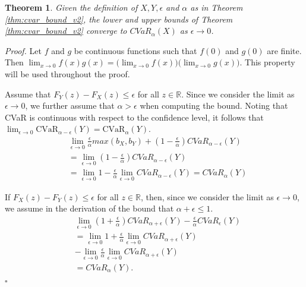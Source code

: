 \documentclass[letterpaper]{article} %
\newtheorem{theorem}{Theorem}[section]
\newenvironment{proof}{\noindent\textit{Proof.}}{\hfill$\square$}
\begin{document}
\begin{theorem}\label{thm:cvar_bound_convergence}
	Given the definition of $X,Y,\epsilon$ and $\alpha$ as in Theorem \ref{thm:cvar_bound_v2}, the lower and upper bounds of Theorem \ref{thm:cvar_bound_v2} converge to $CVaR_\alpha(X)$ as $\epsilon \rightarrow 0$.
\end{theorem}
\begin{proof}
	Let $f$ and $g$ be continuous functions such that $f(0)$ and $g(0)$ are finite. Then
	$\lim_{x \to 0} f(x) g(x) = \big( \lim_{x \to 0} f(x) \big) \big( \lim_{x \to 0} g(x) \big)$.
	This property will be used throughout the proof.
	
	Assume that $F_Y(z) - F_X(z) \leq \epsilon$ for all $z \in \mathbb{R}$. Since we consider the limit as $\epsilon \to 0$, we further assume that $\alpha > \epsilon$ when computing the bound. Noting that CVaR is continuous with respect to the confidence level, it follows that $\lim_{\epsilon \to 0} \mathrm{CVaR}_{\alpha - \epsilon}(Y) = \mathrm{CVaR}_{\alpha}(Y)$.
	\begin{equation}
		\begin{aligned}
			&\lim_{\epsilon\rightarrow 0} \frac{\epsilon}{\alpha}max(b_X,b_Y) + (1 - \frac{\epsilon}{\alpha})CVaR_{\alpha-\epsilon}(Y) \\
			&=\lim_{\epsilon \rightarrow 0} (1 - \frac{\epsilon}{\alpha})CVaR_{\alpha-\epsilon}(Y) \\
			&=\lim_{\epsilon \rightarrow 0} 1 - \frac{\epsilon}{\alpha} \lim_{\epsilon\rightarrow 0} CVaR_{\alpha-\epsilon}(Y)=CVaR_\alpha(Y)
		\end{aligned}
	\end{equation}
	
	If $F_X(z) - F_Y(z) \leq \epsilon$ for all $z \in \mathbb{R}$, then, since we consider the limit as $\epsilon \to 0$, we assume in the derivation of the bound that $\alpha + \epsilon \leq 1$.
	\begin{equation}
		\begin{aligned}
			&\lim_{\epsilon\rightarrow 0} (1+\frac{\epsilon}{\alpha})CVaR_{\alpha+\epsilon}(Y)-\frac{\epsilon}{\alpha} CVaR_{\epsilon}(Y) \\
			&=\lim_{\epsilon\rightarrow 0} 1+\frac{\epsilon}{\alpha} \lim_{\epsilon\rightarrow 0} CVaR_{\alpha+\epsilon}(Y) \\
			&-\lim_{\epsilon\rightarrow 0} \frac{\epsilon}{\alpha} \lim_{\epsilon \rightarrow 0} CVaR_{\alpha+\epsilon}(Y) \\
			&=CVaR_\alpha(Y).
		\end{aligned}
	\end{equation}
\end{proof}
\end{document}
